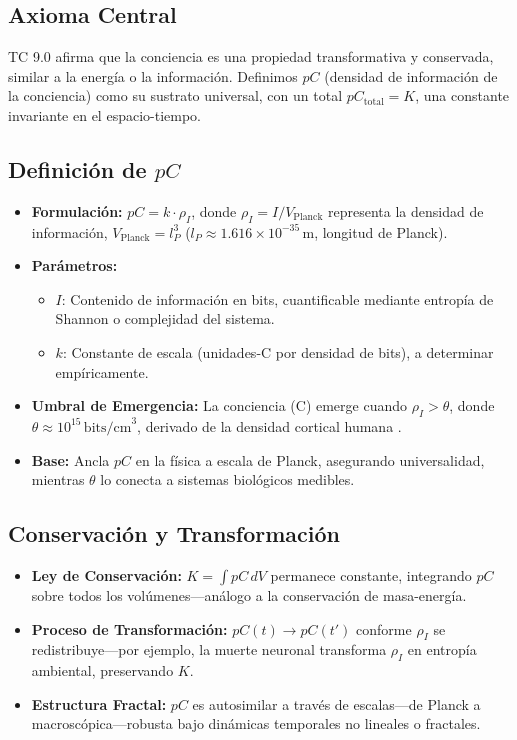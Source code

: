 \documentclass[11pt]{article}
\begin{document}
\subsection{Axioma Central}
TC 9.0 afirma que la conciencia es una propiedad transformativa y conservada, similar a la energía o la información. Definimos $pC$ (densidad de información de la conciencia) como su sustrato universal, con un total $pC_{\text{total}} = K$, una constante invariante en el espacio-tiempo.

\subsection{Definición de $pC$}
\begin{itemize}
    \item \textbf{Formulación:} $pC = k \cdot \rho_I$, donde $\rho_I = I / V_{\text{Planck}}$ representa la densidad de información, $V_{\text{Planck}} = l_P^3$ ($l_P \approx 1.616 \times 10^{-35} \, \text{m}$, longitud de Planck).
    \item \textbf{Parámetros:}
    \begin{itemize}
        \item $I$: Contenido de información en bits, cuantificable mediante entropía de Shannon o complejidad del sistema.
        \item $k$: Constante de escala (unidades-C por densidad de bits), a determinar empíricamente.
    \end{itemize}
    \item \textbf{Umbral de Emergencia:} La conciencia (C) emerge cuando $\rho_I > \theta$, donde $\theta \approx 10^{15} \, \text{bits/cm}^3$, derivado de la densidad cortical humana \citep{laughlin2003communication}.
    \item \textbf{Base:} Ancla $pC$ en la física a escala de Planck, asegurando universalidad, mientras $\theta$ lo conecta a sistemas biológicos medibles.
\end{itemize}

\subsection{Conservación y Transformación}
\begin{itemize}
    \item \textbf{Ley de Conservación:} $K = \int pC \, dV$ permanece constante, integrando $pC$ sobre todos los volúmenes—análogo a la conservación de masa-energía.
    \item \textbf{Proceso de Transformación:} $pC(t) \rightarrow pC(t')$ conforme $\rho_I$ se redistribuye—por ejemplo, la muerte neuronal transforma $\rho_I$ en entropía ambiental, preservando $K$.
    \item \textbf{Estructura Fractal:} $pC$ es autosimilar a través de escalas—de Planck a macroscópica—robusta bajo dinámicas temporales no lineales o fractales.
\end{itemize}
\end{document}
